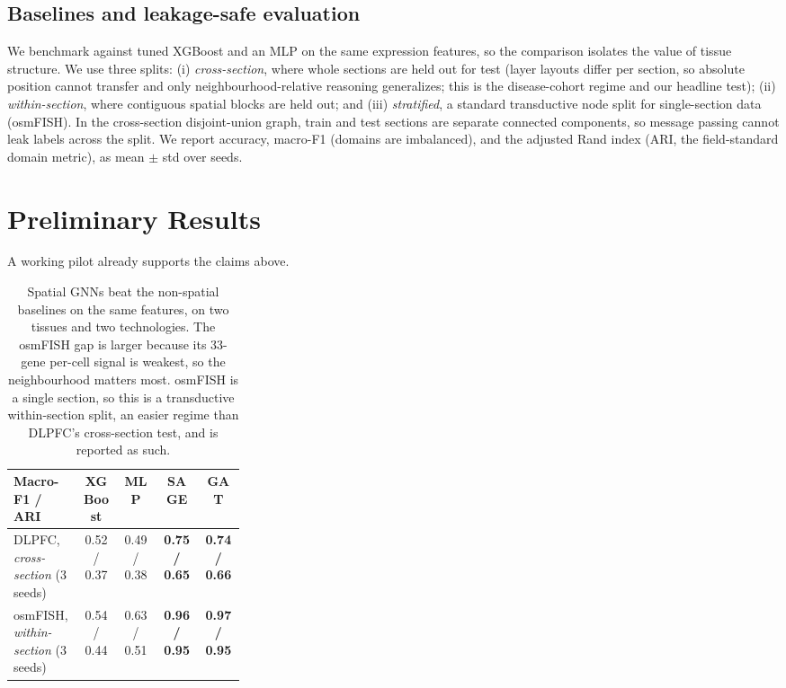 \documentclass[11pt]{article}
\begin{document}
\subsection{Baselines and leakage-safe evaluation}
We benchmark against tuned XGBoost and an MLP on the same expression features, so
the comparison isolates the value of tissue structure. We use three splits:
(i) \emph{cross-section}, where whole sections are held out for test (layer
layouts differ per section, so absolute position cannot transfer and only
neighbourhood-relative reasoning generalizes; this is the disease-cohort regime
and our headline test); (ii) \emph{within-section}, where contiguous spatial
blocks are held out; and (iii) \emph{stratified}, a standard transductive node
split for single-section data (osmFISH). In the cross-section disjoint-union
graph, train and test sections are separate connected components, so message
passing cannot leak labels across the split. We report accuracy, macro-F1
(domains are imbalanced), and the adjusted Rand index (ARI, the field-standard
domain metric), as mean $\pm$ std over seeds.

\section{Preliminary Results}

A working pilot already supports the claims above.

\begin{table}[H]
\centering\small
\begin{tabular}{>{\raggedright\arraybackslash}p{0.30\linewidth} cccc}
\toprule
\rowcolor{sriblue}\color{white}\textbf{Macro-F1 / ARI} & \color{white}\textbf{XGBoost} & \color{white}\textbf{MLP} & \color{white}\textbf{SAGE} & \color{white}\textbf{GAT}\\
\midrule
\rowcolor{srirow} DLPFC, \emph{cross-section} (3 seeds) & 0.52 / 0.37 & 0.49 / 0.38 & \textbf{0.75 / 0.65} & \textbf{0.74 / 0.66}\\
osmFISH, \emph{within-section} (3 seeds) & 0.54 / 0.44 & 0.63 / 0.51 & \textbf{0.96 / 0.95} & \textbf{0.97 / 0.95}\\
\bottomrule
\end{tabular}
\caption{Spatial GNNs beat the non-spatial baselines on the same features, on two
tissues and two technologies. The osmFISH gap is larger because its 33-gene
per-cell signal is weakest, so the neighbourhood matters most. osmFISH is a single
section, so this is a transductive within-section split, an easier regime than
DLPFC's cross-section test, and is reported as such.}
\label{tab:prelim}
\end{table}
\end{document}
